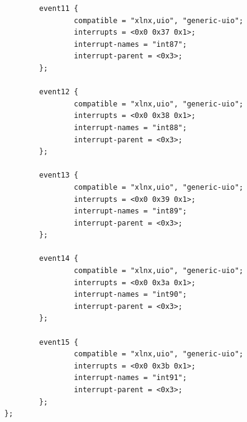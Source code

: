 \begin{verbatim}
                event11 {
                        compatible = "xlnx,uio", "generic-uio";
                        interrupts = <0x0 0x37 0x1>;
                        interrupt-names = "int87";
                        interrupt-parent = <0x3>;
                };

                event12 {
                        compatible = "xlnx,uio", "generic-uio";
                        interrupts = <0x0 0x38 0x1>;
                        interrupt-names = "int88";
                        interrupt-parent = <0x3>;
                };

                event13 {
                        compatible = "xlnx,uio", "generic-uio";
                        interrupts = <0x0 0x39 0x1>;
                        interrupt-names = "int89";
                        interrupt-parent = <0x3>;
                };

                event14 {
                        compatible = "xlnx,uio", "generic-uio";
                        interrupts = <0x0 0x3a 0x1>;
                        interrupt-names = "int90";
                        interrupt-parent = <0x3>;
                };

                event15 {
                        compatible = "xlnx,uio", "generic-uio";
                        interrupts = <0x0 0x3b 0x1>;
                        interrupt-names = "int91";
                        interrupt-parent = <0x3>;
                };
        };
   \end{verbatim}
